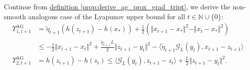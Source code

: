 \documentclass[12pt]{article}
\begin{document}
        \begin{lemma}
        \label{lemma:nsmooth_agg_lyapunov_upper_bound}
            Continue from 
            \hyperref[prop:derive_ag_prox_grad_tript]
            {definition \ref*{prop:derive_ag_prox_grad_tript}},
            we derive the non-smooth analogous case of the Lyapunov upper bound for all $t \in \mathbb N \cup \{0\}$: 
            \begin{align*}
                \Upsilon_{1, t + 1}^\text{AG}
                &= 
                \tilde\eta_{t + 1} (h(z_{t + 1}) - h(x_*)) + 
                \frac{1}{2} (
                    \Vert x_{t + 1} - x_*\Vert^2
                    - 
                    \Vert x_t - x_*\Vert^2
                )
                \\
                &\le 
                - \frac{1}{2}\Vert x_{t + 1} - x_t\Vert^2 
                + \frac{\tilde\eta_{t + 1}L}{2}\Vert z_{t + 1} - y_t\Vert^2
                - \langle 
                    \tilde\eta_{t + 1} \mathcal G_L(y_t), 
                    x_{t + 1} - z_{t + 1}
                \rangle
                \\
                \Upsilon_{2, t + 1}^\text{AG}
                &= 
                h(z_{t + 1}) - h(z_t) 
                \le 
                \langle \mathcal G_L(y_t), z_{t + 1} - z_t\rangle + 
                \frac{L}{2}\Vert z_{t + 1} - y_t\Vert^2. 
            \end{align*}
        \end{lemma}
\end{document}
